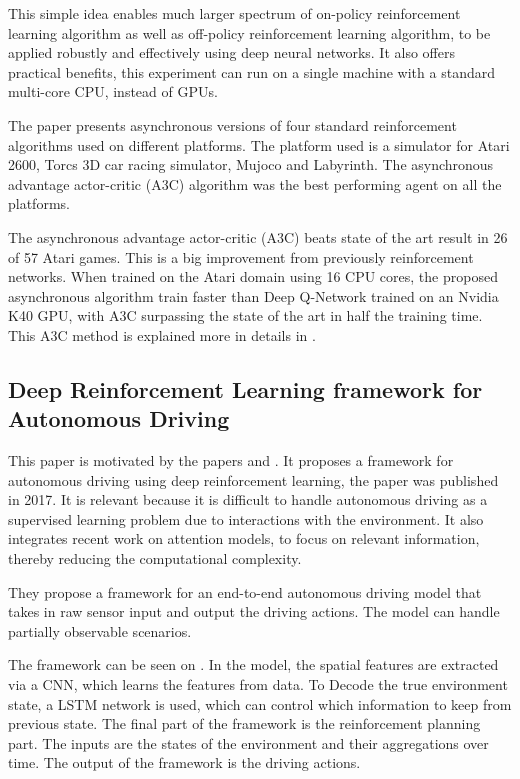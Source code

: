 This simple idea enables much larger spectrum of on-policy reinforcement learning algorithm as well as off-policy reinforcement learning algorithm, to be applied robustly and effectively using deep neural networks.  It also offers practical benefits, this experiment can run on a single machine with a standard multi-core CPU, instead of GPUs.

The paper presents asynchronous versions of four standard reinforcement algorithms used on different platforms. The platform used is a simulator for Atari 2600, Torcs 3D car racing simulator, Mujoco and Labyrinth. The asynchronous advantage actor-critic (A3C) algorithm was the best performing agent on all the platforms.

The asynchronous advantage actor-critic (A3C) beats state of the art result in 26 of 57 Atari games. This is a big improvement from previously reinforcement networks. When trained on the Atari domain using 16 CPU cores, the proposed asynchronous algorithm train faster than Deep Q-Network trained on an Nvidia K40 GPU, with A3C surpassing the state of the art in half the training time. This A3C method is explained more in details in .
   

\subsection{Deep Reinforcement Learning framework for Autonomous Driving} \cite{Sallab:2017:2470-1173:70}
This paper is motivated by the papers \cite{DBLP:journals/corr/MnihKSGAWR13} and \cite{Silver_2016}. It proposes a framework for autonomous driving using deep reinforcement learning, the paper was published in 2017. It is relevant because it is difficult to handle autonomous driving as a supervised learning problem due to interactions with the environment. It also integrates recent work on attention models, to focus on relevant information, thereby reducing the computational complexity.

They propose a framework for an end-to-end autonomous driving model that takes in raw sensor input and output the driving actions. The model can handle partially observable scenarios.  

The framework can be seen on . In the model, the spatial features are extracted via a CNN, which learns the features from data. To Decode the true environment state, a LSTM network is used, which can control which information to keep from previous state. The final part of the framework is the reinforcement planning part. The inputs are the states of the environment and their aggregations over time. The output of the framework is the driving actions.  
 

